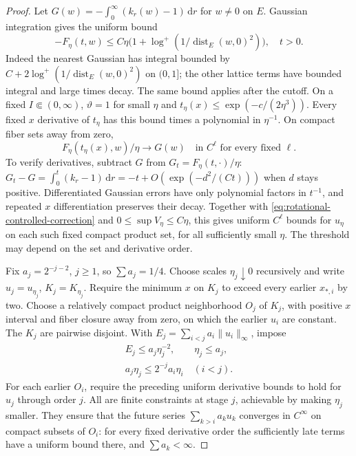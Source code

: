 \begin{proof}
Let $G(w)=-\int_0^\infty(k_r(w)-1)\,\mathrm dr$ for $w\ne0$ on $E$.
Gaussian integration gives the uniform bound
\begin{equation}\label{eq:rotational-off-pole-value}
 -F_\eta(t,w)\leq
 C\eta\bigl(1+\log^+(1/\operatorname{dist}_E(w,0)^2)\bigr),\quad t>0.
\end{equation}
Indeed the nearest Gaussian has integral bounded by
$C+2\log^+(1/\operatorname{dist}_E(w,0)^2)$ on $(0,1]$;
the other lattice terms have bounded integral and large times decay.
The same bound applies after the cutoff.
On a fixed $I\Subset(0,\infty)$, $\vartheta=1$ for small $\eta$ and
$t_\eta(x)\leq\exp(-c/(2\eta^3))$.
Every fixed $x$ derivative of $t_\eta$ has this bound times a polynomial
in $\eta^{-1}$. On compact fiber sets away from zero,
\[
 F_\eta(t_\eta(x),w)/\eta\longrightarrow G(w)
                   \quad\text{in }C^\ell\text{ for every fixed }\ell.
\]
To verify derivatives, subtract $G$ from $G_t=F_\eta(t,\cdot)/\eta$:
$G_t-G=\int_0^t(k_r-1)\,\mathrm dr=-t+O(\exp(-d^2/(Ct)))$ when
$d$ stays positive. Differentiated Gaussian errors have only polynomial
factors in $t^{-1}$, and repeated $x$ differentiation preserves their decay.
Together with \eqref{eq:rotational-controlled-correction} and $0\leq\sup V_\eta\leq C\eta$,
this gives uniform $C^\ell$ bounds for $u_\eta$ on each such fixed compact
product set, for all sufficiently small $\eta$. The threshold may depend
on the set and derivative order.

Fix $a_j=2^{-j-2}$, $j\geq1$, so $\sum a_j=1/4$.
Choose scales $\eta_j\downarrow0$ recursively and write
$u_j=u_{\eta_j}$, $K_j=K_{\eta_j}$.
Require the minimum $x$ on $K_j$ to exceed every earlier $x_{*,i}$ by two.
Choose a relatively compact product neighborhood $O_j$ of $K_j$, with
positive $x$ interval and fiber closure away from zero, on which the earlier
$u_i$ are constant. The $K_j$ are pairwise disjoint.
With $E_j=\sum_{i<j}a_i\|u_i\|_\infty$, impose
\begin{gather*}
 E_j\leq a_j\eta_j^{-2},\qquad \eta_j\leq a_j,\\
 a_j\eta_j\leq2^{-j}a_i\eta_i\quad(i<j).
\end{gather*}
For each earlier $O_i$, require the preceding uniform derivative bounds to
hold for $u_j$ through order $j$. All are finite constraints at stage $j$,
achievable by making $\eta_j$ smaller. They ensure that the future series
$\sum_{k>i}a_ku_k$ converges in $C^\infty$ on compact subsets of $O_i$:
for every fixed derivative order the sufficiently late terms have a uniform
bound there, and $\sum a_k<\infty$.


\end{proof}
